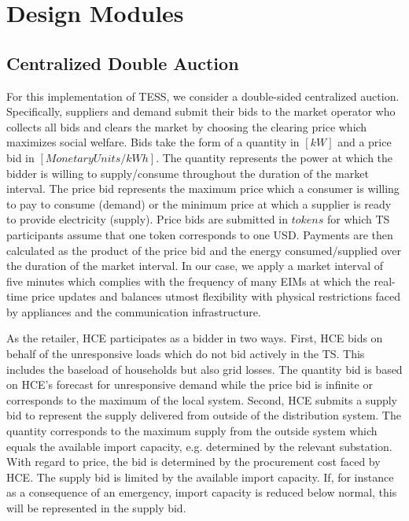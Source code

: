 \section{Design Modules}

\subsection{Centralized Double Auction}

For this implementation of TESS, we consider a double-sided centralized auction. Specifically, suppliers and demand submit their bids to the market operator who collects all bids and clears the market by choosing the clearing price which maximizes social welfare. Bids take the form of a quantity in $[kW]$ and a price bid in $[Monetary Units/kWh]$. The quantity represents the power at which the bidder is willing to supply/consume throughout the duration of the market interval. The price bid represents the maximum price which a consumer is willing to pay to consume (demand) or the minimum price at which a supplier is ready to provide electricity (supply). Price bids are submitted in $tokens$ for which TS participants assume that one token corresponds to one USD. Payments are then calculated as the product of the price bid and the energy consumed/supplied over the duration of the market interval. In our case, we apply a market interval of five minutes which complies with the frequency of many EIMs at which the real-time price updates and balances utmost flexibility with physical restrictions faced by appliances and the communication infrastructure.

As the retailer, HCE participates as a bidder in two ways. First, HCE bids on behalf of the unresponsive loads which do not bid actively in the TS. This includes the baseload of households but also grid losses. The quantity bid is based on HCE's forecast for unresponsive demand while the price bid is infinite or corresponds to the maximum of the local system. Second, HCE submits a supply bid to represent the supply delivered from outside of the distribution system. The quantity corresponds to the maximum supply from the outside system which equals the available import capacity, e.g. determined by the relevant substation. With regard to price, the bid is determined by the procurement cost faced by HCE. The supply bid is limited by the available import capacity. If, for instance as a consequence of an emergency, import capacity is reduced below normal, this will be represented in the supply bid.

